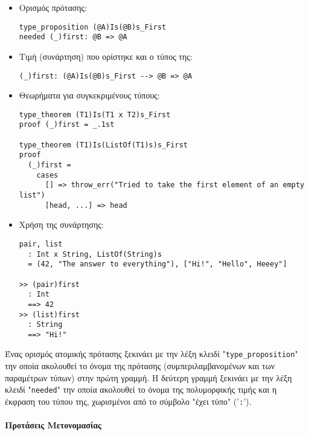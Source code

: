 \documentclass[diploma]{softlab-thesis}
\begin{document}
\begin{itemize}
\begin{itemize}
\item Ορισμός πρότασης:

\begin{verbatim}
type_proposition (@A)Is(@B)s_First
needed (_)first: @B => @A
\end{verbatim}

\item Τιμή (συνάρτηση) που ορίστηκε και ο τύπος της:

\begin{verbatim}
(_)first: (@A)Is(@B)s_First --> @B => @A
\end{verbatim}

\item Θεωρήματα για συγκεκριμένους τύπους:

\begin{verbatim}
type_theorem (T1)Is(T1 x T2)s_First
proof (_)first = _.1st

type_theorem (T1)Is(ListOf(T1)s)s_First
proof
  (_)first =
    cases
      [] => throw_err("Tried to take the first element of an empty list")
      [head, ...] => head
\end{verbatim}

\item Χρήση της συνάρτησης:
\begin{verbatim}
pair, list
  : Int x String, ListOf(String)s
  = (42, "The answer to everything"), ["Hi!", "Hello", Heeey"]

>> (pair)first
  : Int
  ==> 42
>> (list)first
  : String
  ==> "Hi!"
\end{verbatim}
\end{itemize}

Ένας ορισμός ατομικής πρότασης ξεκινάει με την λέξη κλειδί
"\verb|type_proposition|" την οποία ακολουθεί το όνομα της πρότασης
(συμπεριλαμβανομένων και των παραμέτρων τύπων) στην πρώτη γραμμή.  Η δεύτερη
γραμμή ξεκινάει με την λέξη κλειδί "\verb|needed|" την οποία ακολουθεί το όνομα
της πολυμορφικής τιμής και η έκφραση του τύπου της, χωρισμένοι από το σύμβολο
"έχει τύπο" ('\verb|:|').

\end{itemize}

\newpage

\paragraph{Προτάσεις Μετονομασίας}
\end{document}
